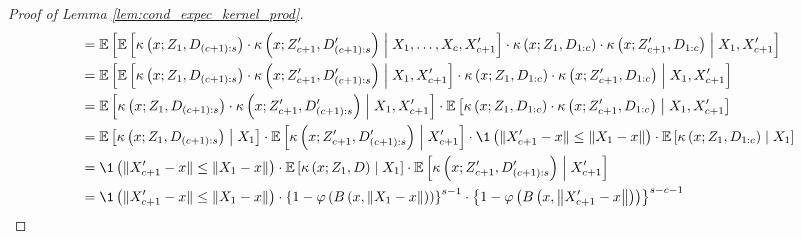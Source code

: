 \begin{proof}[Proof of Lemma \ref{lem:cond_expec_kernel_prod}]
\begin{equation}
\begin{aligned}
        & = \E\left[
                \E\left[
                    \kappa\left(x; Z_{1}, D_{(c+1):s}\right)
                    \cdot \kappa\left(x; Z_{c+1}^{\prime}, D^{\prime}_{(c+1):s}\right)
                \; \middle| \; X_1, \dotsc, X_{c}, X_{c+1}^{\prime}\right] 
                \cdot \kappa\left(x; Z_{1}, D_{1:c}\right)
                \cdot \kappa\left(x; Z_{c+1}^{\prime}, D_{1:c}\right)
            \; \middle| \; X_1, X_{c+1}^{\prime}\right] \\
        & = \E\left[
                \E\left[
                    \kappa\left(x; Z_{1}, D_{(c+1):s}\right)
                    \cdot \kappa\left(x; Z_{c+1}^{\prime}, D^{\prime}_{(c+1):s}\right)
                \; \middle| \; X_1, X_{c+1}^{\prime}\right] 
                \cdot \kappa\left(x; Z_{1}, D_{1:c}\right)
                \cdot \kappa\left(x; Z_{c+1}^{\prime}, D_{1:c}\right)
            \; \middle| \; X_1, X_{c+1}^{\prime}\right] \\
        & = \E\left[
                    \kappa\left(x; Z_{1}, D_{(c+1):s}\right)
                    \cdot \kappa\left(x; Z_{c+1}^{\prime}, D^{\prime}_{(c+1):s}\right)
            \; \middle| \; X_1, X_{c+1}^{\prime}\right] 
            \cdot \E\left[
                \kappa\left(x; Z_{1}, D_{1:c}\right)
                \cdot \kappa\left(x; Z_{c+1}^{\prime}, D_{1:c}\right)
            \; \middle| \; X_1, X_{c+1}^{\prime}\right] \\
        & = \E\left[\kappa\left(x; Z_{1}, D_{(c+1):s}\right)\; \middle| \; X_1\right] 
            \cdot \E\left[\kappa\left(x; Z_{c+1}^{\prime}, D^{\prime}_{(c+1):s}\right)
            \; \middle| \; X_{c+1}^{\prime}\right] 
            \cdot \1\left(\|X_{c+1}^{\prime} - x\| \leq \|X_{1} - x\|\right)
            \cdot \E\left[
                \kappa\left(x; Z_{1}, D_{1:c}\right)
            \; \middle| \; X_1\right] \\
        & = \1\left(\|X_{c+1}^{\prime} - x\| \leq \|X_{1} - x\|\right)
        \cdot \E\left[\kappa\left(x; Z_{1}, D\right)\; \middle| \; X_1\right] 
        \cdot \E\left[\kappa\left(x; Z_{c+1}^{\prime}, D^{\prime}_{(c+1):s}\right)
            \; \middle| \; X_{c+1}^{\prime}\right] \\
        & = \1\left(\|X_{c+1}^{\prime} - x\| \leq \|X_{1} - x\|\right)
            \cdot \left\{1-\varphi\left(B\left(x,\left\|X_1-x\right\|\right)\right)\right\}^{s-1}
            \cdot \left\{1-\varphi\left(B\left(x,\left\|X_{c+1}^{\prime}-x\right\|\right)\right)\right\}^{s-c-1}
    \end{aligned}

\end{equation}
\end{proof}

